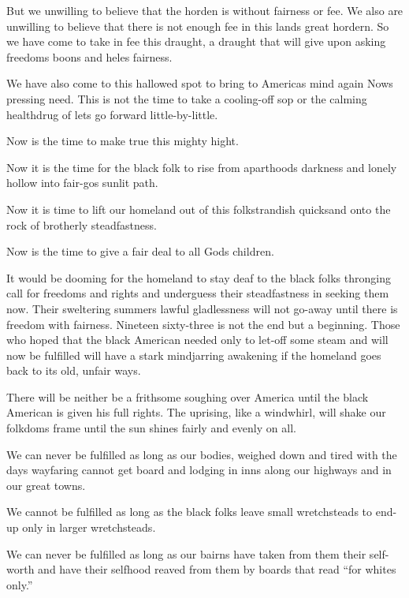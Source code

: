 But we unwilling to believe that the horden is without fairness or
fee. We also are unwilling to believe that there is not enough fee
in this land\textquotesingle{}s great hordern. So we have come to
take in fee this draught, a draught that will give upon asking
freedom\textquotesingle{}s boons and hele\textquotesingle{}s
fairness.

We have also come to this hallowed spot to bring to
America\textquotesingle{}s mind again Now\textquotesingle{}s
pressing need. This is not the time to take a cooling-off sop or
the calming healthdrug of let\textquotesingle{}s go forward
little-by-little.

Now is the time to make true this mighty hight.

Now it is the time for the black folk to rise from
aparthood\textquotesingle{}s darkness and lonely hollow into
fair-go\textquotesingle{}s sunlit path.

Now it is time to lift our homeland out of this folkstrandish
quicksand onto the rock of brotherly steadfastness.

Now is the time to give a fair deal to all God\textquotesingle{}s
children.

It would be dooming for the homeland to stay deaf to the black
folk\textquotesingle{}s thronging call for freedoms and rights and
underguess their steadfastness in seeking them now. Their
sweltering summer\textquotesingle{}s lawful gladlessness will not
go-away until there is freedom with fairness. Nineteen sixty-three
is not the end but a beginning. Those who hoped that the black
American needed only to let-off some steam and will now be
fulfilled will have a stark mindjarring awakening if the homeland
goes back to its old, unfair ways.

There will be neither be a frithsome soughing over America until
the black American is given his full rights. The uprising, like a
windwhirl, will shake our folkdom\textquotesingle{}s frame until
the sun shines fairly and evenly on all.

We can never be fulfilled as long as our bodies, weighed down and
tired with the day\textquotesingle{}s wayfaring cannot get board
and lodging in inns along our highways and in our great towns.

We cannot be fulfilled as long as the black folks leave small
wretchsteads to end-up only in larger wretchsteads.

We can never be fulfilled as long as our bairns have taken from
them their self-worth and have their selfhood reaved from them by
boards that read ``for whites only.''

